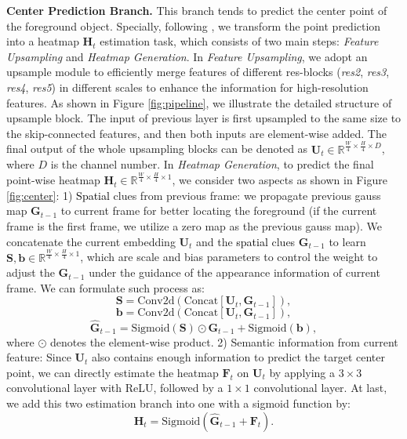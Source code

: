 \documentclass[letterpaper]{article} \usepackage{aaai20}  \usepackage{times}  \usepackage{helvet} \usepackage{courier}  \usepackage[hyphens]{url}  \usepackage{graphicx} \urlstyle{rm} \def\UrlFont{\rm}  \usepackage{graphicx}  \frenchspacing  \setlength{\pdfpagewidth}{8.5in}  \setlength{\pdfpageheight}{11in}  \usepackage{amssymb}
\newcommand{\ldz}[1]{\textcolor{black}{#1}}
\begin{document}
\noindent \textbf{Center Prediction Branch.}
This branch tends to predict the center point of the foreground object. Specially, following \cite{tompson2014joint}, we transform the point prediction into a heatmap $\bm{H}_t$ estimation task, which consists of two main steps: \textit{Feature Upsampling} and \textit{Heatmap Generation}.
In \textit{Feature Upsampling}, we adopt an upsample module to efficiently merge features of different res-blocks (\textit{res2}, \textit{res3}, \textit{res4}, \textit{res5}) in different scales to enhance the information for high-resolution features. 
As shown in Figure \ref{fig:pipeline}, we illustrate the detailed structure of upsample block. The input of previous layer is first upsampled to the same size to the skip-connected features, and then both inputs are element-wise added. The final output of the whole upsampling blocks can be denoted as $\bm{U}_t \in \mathbb{R}^{\frac{W}{4} \times \frac{H}{4} \times D}$, where $D$ is the channel number. In \textit{Heatmap Generation}, to predict the final point-wise heatmap $\bm{H}_t \in \mathbb{R}^{\frac{W}{4} \times \frac{H}{4} \times 1}$, we consider two aspects as shown in Figure \ref{fig:center}: 1) \ldz{Spatial} clues from previous frame: we propagate previous gauss map $\bm{G}_{t-1}$ to current frame for better locating the foreground
(if the current frame is the first frame, we utilize a zero map as the previous gauss map). We concatenate the current embedding $\bm{U}_t$ and the \ldz{spatial} clues $\bm{G}_{t-1}$ to learn $\bm{S}, \bm{b} \in \mathbb{R}^{\frac{W}{4} \times \frac{H}{4} \times 1}$, which are scale and bias parameters \ldz{\cite{yang2018efficient}} to control the weight to adjust the $\bm{G}_{t-1}$ under the guidance of the appearance information of current frame.
We can formulate such process as:
\begin{equation}
    \bm{S} = \text{Conv2d}(\text{Concat}[\bm{U}_t,\bm{G}_{t-1}]),
\end{equation}
\begin{equation}
    \bm{b} = \text{Conv2d}(\text{Concat}[\bm{U}_t,\bm{G}_{t-1}]),
\end{equation}
\begin{equation}
    \hat{\bm{G}}_{t-1} = \text{Sigmoid}(\bm{S}) \odot \bm{G}_{t-1} + \text{Sigmoid}(\bm{b}),
\end{equation}
where $\odot$ denotes the element-wise product. 2) Semantic information from current feature: Since $\bm{U}_t$ also contains enough information to predict the target center point, we can directly estimate the heatmap $\bm{F}_t$ on $\bm{U}_t$ by applying a $3\times 3$ convolutional layer with ReLU, followed by a $1\times 1$ convolutional layer. 
At last, we add this two estimation branch into one with a sigmoid function by:
\begin{equation}
    \bm{H}_t = \text{Sigmoid}(\hat{\bm{G}}_{t-1} + \bm{F}_t).
    \label{eq:heatmap}
\end{equation}
\end{document}
